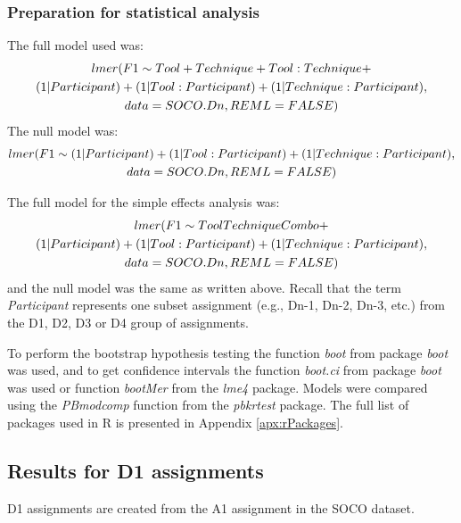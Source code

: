 \documentclass[a4paper, 12pt, oneside, openany, final, pdftex]{book}\usepackage[]{graphicx}\usepackage[]{color}
\begin{document}
\subsubsection{Preparation for statistical analysis}

The full model used was: 
\begin{gather*}
lmer(F1 \sim Tool + Technique + Tool:Technique + \notag\\
             (1 | Participant) + (1 | Tool:Participant) + (1 | Technique:Participant), \notag\\ 
     data = SOCO.Dn, REML = FALSE)
\end{gather*}
The null model was: 
\begin{gather*}
lmer(F1 \sim (1 | Participant) + (1 | Tool:Participant) + (1 | Technique:Participant), \notag\\
     data = SOCO.Dn, REML = FALSE)
\end{gather*}

The full model for the simple effects analysis was:
\begin{gather*}
lmer(F1 \sim ToolTechniqueCombo + \notag\\
             (1 | Participant) + (1 | Tool:Participant) + (1 | Technique:Participant), \notag\\ 
     data = SOCO.Dn, REML = FALSE)
\end{gather*} 
and the null model was the same as written above. Recall that the term \textit{Participant} represents one subset assignment (e.g., Dn-1, Dn-2, Dn-3, etc.) from the D1, D2, D3 or D4 group of assignments.

To perform the bootstrap hypothesis testing the function \textit{boot} from package \textit{boot} was used, and to get confidence intervals the function \textit{boot.ci} from package \textit{boot} was used or function \textit{bootMer} from the \textit{lme4} package. Models were compared using the \textit{PBmodcomp} function from the \textit{pbkrtest} package. The full list of packages used in R is presented in Appendix \ref{apx:rPackages}.

\subsection{Results for D1 assignments}

    

D1 assignments are created from the A1 assignment in the \gls{SOCO} dataset. 
\end{document}
